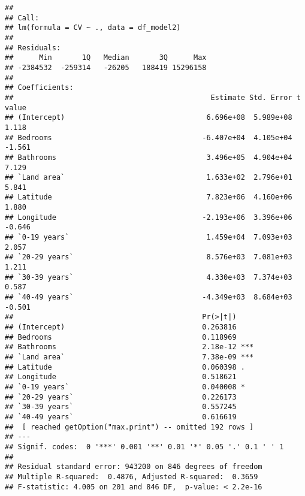 \documentclass[
]{article}
\begin{document}
\begin{verbatim}
## 
## Call:
## lm(formula = CV ~ ., data = df_model2)
## 
## Residuals:
##      Min       1Q   Median       3Q      Max 
## -2384532  -259314   -26205   188419 15296158 
## 
## Coefficients:
##                                              Estimate Std. Error t value
## (Intercept)                                 6.696e+08  5.989e+08   1.118
## Bedrooms                                   -6.407e+04  4.105e+04  -1.561
## Bathrooms                                   3.496e+05  4.904e+04   7.129
## `Land area`                                 1.633e+02  2.796e+01   5.841
## Latitude                                    7.823e+06  4.160e+06   1.880
## Longitude                                  -2.193e+06  3.396e+06  -0.646
## `0-19 years`                                1.459e+04  7.093e+03   2.057
## `20-29 years`                               8.576e+03  7.081e+03   1.211
## `30-39 years`                               4.330e+03  7.374e+03   0.587
## `40-49 years`                              -4.349e+03  8.684e+03  -0.501
##                                            Pr(>|t|)    
## (Intercept)                                0.263816    
## Bedrooms                                   0.118969    
## Bathrooms                                  2.18e-12 ***
## `Land area`                                7.38e-09 ***
## Latitude                                   0.060398 .  
## Longitude                                  0.518621    
## `0-19 years`                               0.040008 *  
## `20-29 years`                              0.226173    
## `30-39 years`                              0.557245    
## `40-49 years`                              0.616619    
##  [ reached getOption("max.print") -- omitted 192 rows ]
## ---
## Signif. codes:  0 '***' 0.001 '**' 0.01 '*' 0.05 '.' 0.1 ' ' 1
## 
## Residual standard error: 943200 on 846 degrees of freedom
## Multiple R-squared:  0.4876, Adjusted R-squared:  0.3659 
## F-statistic: 4.005 on 201 and 846 DF,  p-value: < 2.2e-16
\end{verbatim}
\end{document}
